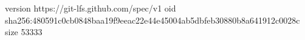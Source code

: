 version https://git-lfs.github.com/spec/v1
oid sha256:480591c0cb0848baa19f9eeac22e44e45004ab5dbfeb30880b8a641912c0028c
size 53333
